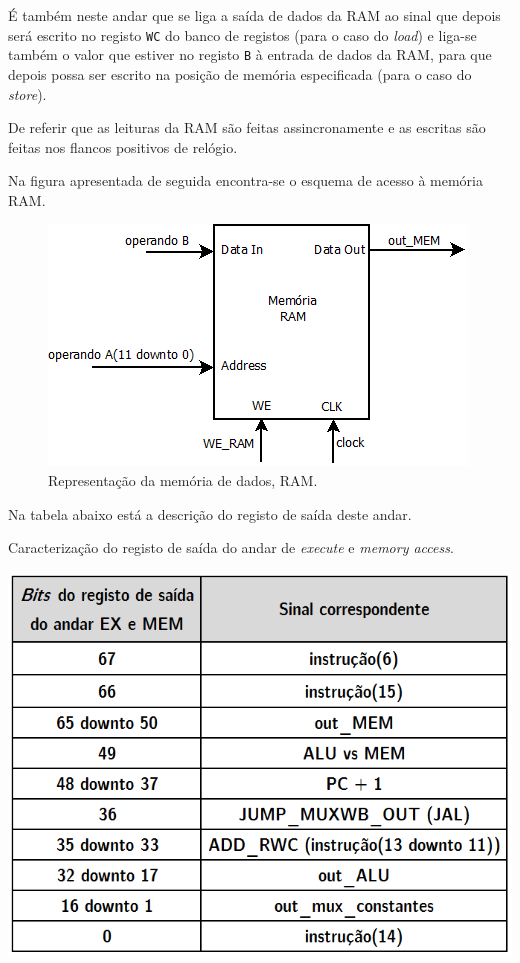 \documentclass[11pt]{article}
\numberwithin{equation}{section}
\begin{document}
É também neste andar que se liga a saída de dados da RAM ao sinal que depois será escrito no registo \texttt{WC} do banco de registos (para o caso do \textit{load}) e liga-se também o valor que estiver no registo \texttt{B} à entrada de dados da RAM, para que depois possa ser escrito na posição de memória especificada (para o caso do \textit{store}).

De referir que as leituras da RAM são feitas assincronamente e as escritas são feitas nos flancos positivos de relógio. 

Na figura apresentada de seguida encontra-se o esquema de acesso à memória RAM.

\begin{figure}[H]
	\centering
	\includegraphics[keepaspectratio=true, scale=0.40]{imagens/RAM}
	\caption{Representação da memória de dados, RAM.}
	\vspace{-0.8em}
\end{figure}

Na tabela abaixo está a descrição do registo de saída deste andar.

\begin{table}[h]
	\centering
	\caption{Caracterização do registo de saída do andar de \textit{execute} e \textit{memory access}.}
	\vspace{-2mm}
 	\includegraphics[keepaspectratio=true, scale=0.45]{tabelas/regEXMEM}
\end{table}
\end{document}
